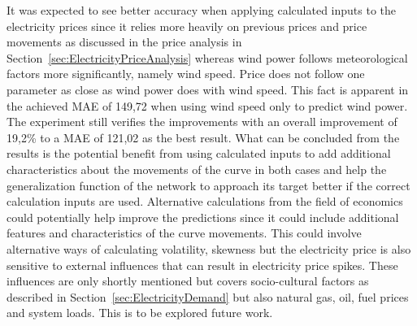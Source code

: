 It was expected to see better accuracy when applying calculated inputs to the electricity prices since it relies more heavily on previous prices and price movements as discussed in the price analysis in Section~\ref{sec:ElectricityPriceAnalysis} whereas wind power follows meteorological factors more significantly, namely wind speed. Price does not follow one parameter as close as wind power does with wind speed. This fact is apparent in the achieved MAE of 149,72 when using wind speed only to predict wind power. The experiment still verifies the improvements with an overall improvement of 19,2\% to a MAE of 121,02 as the best result. What can be concluded from the results is the potential benefit from using calculated inputs to add additional characteristics about the movements of the curve in both cases and help the generalization function of the network to approach its target better if the correct calculation inputs are used. Alternative calculations from the field of economics could potentially help improve the predictions since it could include additional features and characteristics of the curve movements. This could involve alternative ways of calculating volatility, skewness but the electricity price is also sensitive to external influences that can result in electricity price spikes\cite{singhal2011electricity}. These influences are only shortly mentioned but covers socio-cultural factors as described in Section~\ref{sec:ElectricityDemand} but also natural gas, oil, fuel prices and system loads\cite{singhal2011electricity}. This is to be explored future work. 